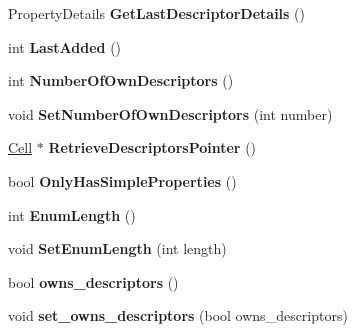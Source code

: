\begin{DoxyCompactItemize}
\item 
Property\+Details {\bfseries Get\+Last\+Descriptor\+Details} ()\hypertarget{classv8_1_1internal_1_1_map_a65a92d49fd359b45d9133908b5519f7d}{}\label{classv8_1_1internal_1_1_map_a65a92d49fd359b45d9133908b5519f7d}

\item 
int {\bfseries Last\+Added} ()\hypertarget{classv8_1_1internal_1_1_map_a23535159e272ca1b2b1d41d972bf2024}{}\label{classv8_1_1internal_1_1_map_a23535159e272ca1b2b1d41d972bf2024}

\item 
int {\bfseries Number\+Of\+Own\+Descriptors} ()\hypertarget{classv8_1_1internal_1_1_map_a0b40d3fcd95554e43b2ffc0c3a2218ea}{}\label{classv8_1_1internal_1_1_map_a0b40d3fcd95554e43b2ffc0c3a2218ea}

\item 
void {\bfseries Set\+Number\+Of\+Own\+Descriptors} (int number)\hypertarget{classv8_1_1internal_1_1_map_a6dcbe6ad0bd9b7e7db9e4b8d0c9c10c3}{}\label{classv8_1_1internal_1_1_map_a6dcbe6ad0bd9b7e7db9e4b8d0c9c10c3}

\item 
\hyperlink{classv8_1_1internal_1_1_cell}{Cell} $\ast$ {\bfseries Retrieve\+Descriptors\+Pointer} ()\hypertarget{classv8_1_1internal_1_1_map_a0b8b0aaeb7369127735a934852770063}{}\label{classv8_1_1internal_1_1_map_a0b8b0aaeb7369127735a934852770063}

\item 
bool {\bfseries Only\+Has\+Simple\+Properties} ()\hypertarget{classv8_1_1internal_1_1_map_a2efd1917c2566640c7e15474a26afe8d}{}\label{classv8_1_1internal_1_1_map_a2efd1917c2566640c7e15474a26afe8d}

\item 
int {\bfseries Enum\+Length} ()\hypertarget{classv8_1_1internal_1_1_map_a138e7b0b2cc5cd43f507de3896368a27}{}\label{classv8_1_1internal_1_1_map_a138e7b0b2cc5cd43f507de3896368a27}

\item 
void {\bfseries Set\+Enum\+Length} (int length)\hypertarget{classv8_1_1internal_1_1_map_a09932f1a95aa75946acba84a0c90678a}{}\label{classv8_1_1internal_1_1_map_a09932f1a95aa75946acba84a0c90678a}

\item 
bool {\bfseries owns\+\_\+descriptors} ()\hypertarget{classv8_1_1internal_1_1_map_ab149097973d68fd9ceddfa1465036b97}{}\label{classv8_1_1internal_1_1_map_ab149097973d68fd9ceddfa1465036b97}

\item 
void {\bfseries set\+\_\+owns\+\_\+descriptors} (bool owns\+\_\+descriptors)\hypertarget{classv8_1_1internal_1_1_map_ade071f606085fe8a7fb585325da9a7a5}{}\label{classv8_1_1internal_1_1_map_ade071f606085fe8a7fb585325da9a7a5}


\end{DoxyCompactItemize}
